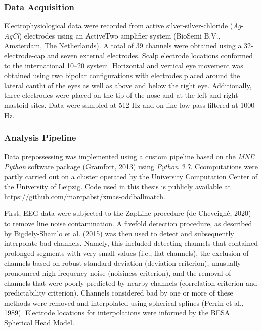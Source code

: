 \documentclass[twoside, man, a4paper,12pt, nofontenc]{apa7}
\begin{document}
\hypertarget{data-acquisition}{%
\subsubsection{Data Acquisition}\label{data-acquisition}}

Electrophysiological data were recorded from active
silver-silver-chloride (\emph{Ag}-\emph{AgCl}) electrodes using an
ActiveTwo amplifier system (BioSemi B.V., Amsterdam, The Netherlands). A
total of 39 channels were obtained using a 32-electrode-cap and seven
external electrodes. Scalp electrode locations conformed to the
international 10--20 system. Horizontal and vertical eye movement was
obtained using two bipolar configurations with electrodes placed around
the lateral canthi of the eyes as well as above and below the right eye.
Additionally, three electrodes were placed on the tip of the nose and at
the left and right mastoid sites. Data were sampled at 512 Hz and
on-line low-pass filtered at 1000 Hz.

\hypertarget{analysis-pipeline}{%
\subsubsection{Analysis Pipeline}\label{analysis-pipeline}}

Data prepossessing was implemented using a custom pipeline based on the
\emph{MNE Python} software package (Gramfort, 2013) using \emph{Python
3.7}. Ccomputations were partly carried out on a cluster operated by the
University Computation Center of the University of Leipzig. Code used in
this thesis is publicly available at
\url{https://github.com/marcpabst/xmas-oddballmatch}.

First, EEG data were subjected to the ZapLine procedure (de Cheveigné,
2020) to remove line noise contamination. A fivefold detection
procedure, as described by Bigdely-Shamlo et al. (2015) was then used to
detect and subsequently interpolate bad channels. Namely, this included
detecting channels that contained prolonged segments with very small
values (i.e., flat channels), the exclusion of channels based on robust
standard deviation (deviation criterion), unusually pronounced
high-frequency noise (noisiness criterion), and the removal of channels
that were poorly predicted by nearby channels (correlation criterion and
predictability criterion). Channels considered bad by one or more of
these methods were removed and interpolated using spherical splines
(Perrin et al., 1989). Electrode locations for interpolations were
informed by the BESA Spherical Head Model.
\end{document}
